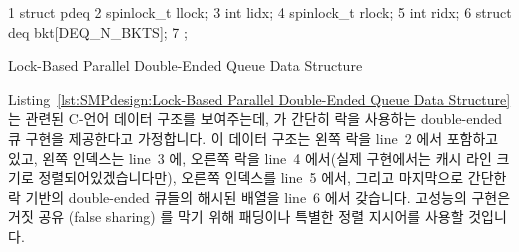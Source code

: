 \begin{listing}[tbp]
{ \scriptsize
\begin{verbbox}
  1 struct pdeq {
  2   spinlock_t llock;
  3   int lidx;
  4   spinlock_t rlock;
  5   int ridx;
  6   struct deq bkt[DEQ_N_BKTS];
  7 };
\end{verbbox}
}
\centering
\theverbbox
\caption{Lock-Based Parallel Double-Ended Queue Data Structure}
\label{lst:SMPdesign:Lock-Based Parallel Double-Ended Queue Data Structure}
\end{listing}

Listing~\ref{lst:SMPdesign:Lock-Based Parallel Double-Ended Queue Data Structure}
는 관련된 C-언어 데이터 구조를 보여주는데,  가 간단히 락을
사용하는 double-ended 큐 구현을 제공한다고 가정합니다.
이 데이터 구조는 왼쪽 락을 line~2 에서 포함하고 있고, 왼쪽 인덱스는 line~3 에,
오른쪽 락을 line~4 에서(실제 구현에서는 캐시 라인 크기로 정렬되어있겠습니다만),
오른쪽 인덱스를 line~5 에서, 그리고 마지막으로 간단한 락 기반의 double-ended
큐들의 해시된 배열을 line~6 에서 갖습니다.
고성능의 구현은 거짓 공유 (false sharing) 를 막기 위해 패딩이나 특별한 정렬
지시어를 사용할 것입니다.

